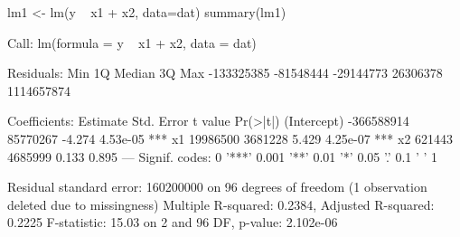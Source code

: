 \begin{Schunk}
\begin{Sinput}
 lm1 <- lm(y ~ x1 + x2, data=dat)
 summary(lm1)
\end{Sinput}
\begin{Soutput}
Call:
lm(formula = y ~ x1 + x2, data = dat)

Residuals:
       Min         1Q     Median         3Q        Max 
-133325385  -81548444  -29144773   26306378 1114657874 

Coefficients:
              Estimate Std. Error t value Pr(>|t|)    
(Intercept) -366588914   85770267  -4.274 4.53e-05 ***
x1            19986500    3681228   5.429 4.25e-07 ***
x2              621443    4685999   0.133    0.895    
---
Signif. codes:  0 '***' 0.001 '**' 0.01 '*' 0.05 '.' 0.1 ' ' 1

Residual standard error: 160200000 on 96 degrees of freedom
  (1 observation deleted due to missingness)
Multiple R-squared:  0.2384,	Adjusted R-squared:  0.2225 
F-statistic: 15.03 on 2 and 96 DF,  p-value: 2.102e-06
\end{Soutput}
\end{Schunk}
